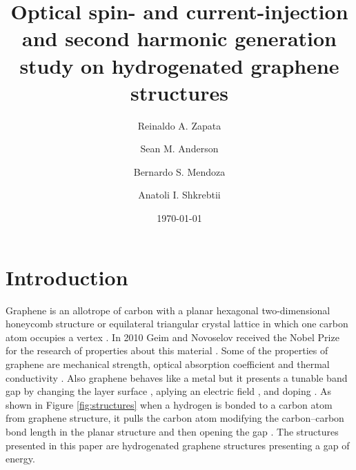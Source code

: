 \documentclass[aps,pra,11pt,tightenlines,showpacs,superscriptaddress,groupedaddress]{revtex4-1}
\begin{document}
\title{Optical spin- and current-injection and second harmonic generation study on hydrogenated graphene structures}

\author{Reinaldo A. Zapata}
\author{Sean M. Anderson}
\author{Bernardo S. Mendoza}
\author{Anatoli I. Shkrebtii}

\date{\today}

\begin{abstract}
\blindtext
\end{abstract}

\maketitle


\section{Introduction}\label{sec:intro}


Graphene is an allotrope of carbon with a planar hexagonal two-dimensional honeycomb structure or equilateral triangular crystal lattice in which one carbon atom occupies a vertex \cite{geim2007rise}. In 2010 Geim and Novoselov received the Nobel Prize for the research of properties about this material \cite{geim2007rise}. Some of the properties of graphene are mechanical strength, optical absorption coefficient and thermal conductivity \cite{geim2007rise, nair2008fine}. Also graphene behaves like a metal \cite{geim2007rise} but it presents a tunable band gap by changing the layer surface \cite{han2007energy}, aplying an electric field \cite{zhang2009direct},  and doping \cite{ohta2006controlling, elias2009control,guisinger2009exposure,samarakoon2010tunable}. As shown in Figure \ref{fig:structures} when a hydrogen is bonded to a carbon atom from graphene structure, it pulls the carbon atom modifying the carbon--carbon bond length in the planar structure and then opening the gap \cite{samarakoon2010tunable}. The structures presented in this paper are hydrogenated graphene structures presenting a gap of energy.
\end{document}
